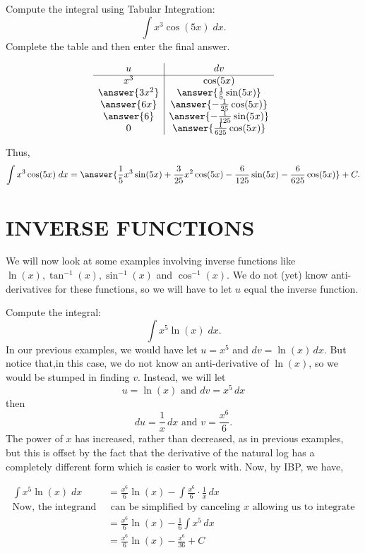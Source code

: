 \documentclass{ximera}
\begin{document}
\begin{problem}
Compute the integral using Tabular Integration:
  \[
  \int x^3 \cos(5x) \;dx.
  \]
Complete the table and then enter the final answer.
\begin{center}
\[
\begin{array}{c|c}
		u & dv  \\\hline 
		x^3 & \cos(5x) \\ 
     \answer{3x^2} & \answer{\frac15 \sin(5x)} \\ 
      \answer{6x} & \answer{-\frac{1}{25} \cos(5x)} \\ 
       \answer{6} & \answer{-\frac{1}{125} \sin(5x)} \\
       0 & \answer{\frac{1}{625} \cos(5x)} 
	\end{array}
    \]
\end{center}



Thus,
\[
  \int x^3 \cos(5x) \;dx = \answer{\frac15 x^3\sin(5x) + \frac{3}{25}x^2 \cos(5x) - \frac{6}{125}\sin(5x) -\frac{6}{625}\cos(5x)} +C.
  \]
\end{problem}



\section{INVERSE FUNCTIONS}

We will now look at some examples involving inverse functions like $\ln(x), \tan^{-1}(x), \sin^{-1}(x)$ and $\cos^{-1}(x)$.
We do not (yet) know anti-derivatives for these functions, so we will have to let $u$ equal the inverse function.
 
\begin{example}
Compute the integral:
  \[
  \int x^5\ln(x) \;dx.
  \]
In our previous examples, we would have let $u = x^5$ and $dv = \ln(x) \, dx$.
But notice that,in this case, we do not know an anti-derivative of $\ln(x)$, so 
we would be stumped in finding $v$. Instead, we will let 
\[
u = \ln(x)  \text{  and  } dv = x^5 \, dx\]
then
\[
du = \frac{1}{x} \, dx \text{  and  } v = \frac{x^6}{6}.
\]
The power of $x$ has increased, rather than decreased, as in previous examples, but this 
is offset by the fact that the derivative of the natural log has a completely different form
which is easier to work with. Now, by IBP, we have,

\begin{align*}
  \int x^5\ln(x) \;dx &= \frac{x^6}{6}\ln(x) - \int \frac{x^6}{6}\cdot \frac{1}{x} \, dx\\
\text{Now, the integrand } & \text{ can be simplified by canceling $x$ allowing us to integrate}\\
&= \frac{x^6}{6}\ln(x) - \frac16\int x^5 \, dx\\
&= \frac{x^6}{6}\ln(x) -  \frac{x^6}{36} + C\\
\end{align*}

\end{example}
\end{document}
